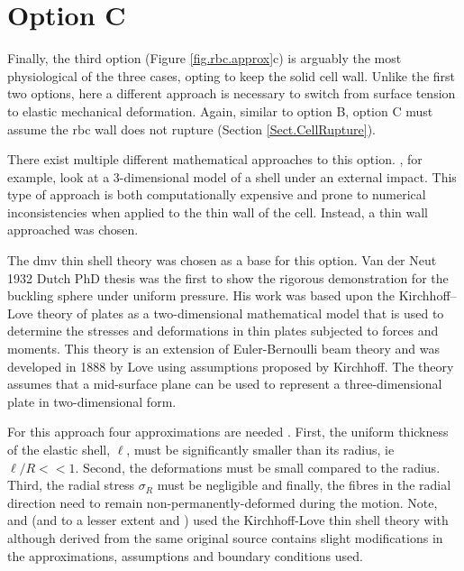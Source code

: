 \section{Option C}

\noindent Finally, the third option (Figure \ref{fig.rbc.approx}c) is arguably the most physiological of the three cases, opting to keep the solid cell wall. Unlike the first two options, here a different approach is necessary to switch from surface tension to elastic mechanical deformation. Again, similar to option B, option C must assume the \ac{rbc} wall does not rupture (Section \ref{Sect.CellRupture}).

There exist multiple different mathematical approaches to this option. \citet{Mansoorbaghaei2011}, for example, look at a 3-dimensional model of a shell under an external impact. This type of approach is both computationally expensive and prone to numerical inconsistencies when applied to the thin wall of the cell. Instead, a thin wall approached was chosen. 

The \ac{dmv} \cite{Hutchinson2016} thin shell theory was chosen as a base for this option. Van der Neut 1932 Dutch PhD thesis was the first to show the rigorous demonstration for the buckling sphere under uniform pressure. His work was based upon the Kirchhoff–Love theory of plates as a two-dimensional mathematical model that is used to determine the stresses and deformations in thin plates subjected to forces and moments. This theory is an extension of Euler-Bernoulli beam theory and was developed in 1888 by Love using assumptions proposed by Kirchhoff. The theory assumes that a mid-surface plane can be used to represent a three-dimensional plate in two-dimensional form.

For this approach four approximations are needed \cite{Chang1994}. First, the uniform thickness of the elastic shell, $\ell$, must be significantly smaller than its radius, ie $\ell/R << 1$. Second, the deformations must be small compared to the radius. Third, the radial stress $\sigma_R$ must be negligible and finally, the fibres in the radial direction need to remain non-permanently-deformed during the motion. Note, \citet{Chang1994} and \citet{Anand2016} (and to a lesser extent \cite{Kraus} and  \cite{Turcotte1981}) used the Kirchhoff-Love thin shell theory with although derived from the same original source contains slight modifications in the approximations, assumptions and boundary conditions used. 


